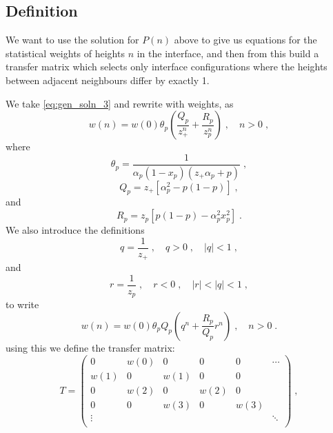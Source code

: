 \documentclass[a4paper,10pt]{article}
\begin{document}
\subsection{Definition}

We want to use the solution for $P(n)$ above to give us equations for the statistical weights of heights $n$ in the interface, and then from this build a transfer matrix which selects only interface configurations where the heights between adjacent neighbours differ by exactly 1. 

We take \eqref{eq:gen_soln_3} and rewrite with weights, as
\begin{equation}
  w(n) = w(0) \theta_p \left( \frac{Q_p}{z_+^{n}} + \frac{R_p}{z_p^{n}}  \right) \;, \quad n > 0 \;,
\end{equation}
where
\begin{equation}
 \theta_p = \frac{1}{ \alpha_p(1-x_p)(z_+\alpha_p + p)} \;, 
\end{equation}
\begin{equation}
  Q_p = z_+[\alpha_p^{2}-p(1-p)] \;,
\end{equation}
and
\begin{equation}
  R_p = z_p[ p(1-p) - \alpha_p^2 x_p^2] \;. 
\end{equation}
We also introduce the definitions
\begin{equation}
  q = \frac{1}{z_+} \;, \quad q > 0 \;, \quad |q| < 1 \;, 
\end{equation}
and
\begin{equation}
  r = \frac{1}{z_p} \;, \quad r < 0 \;, \quad |r| < |q|< 1 \;,
\end{equation}
to write
\begin{equation}
  w(n) = w(0) \theta_p Q_p \left( q^n + \frac{R_p}{Q_p} r^n  \right) \;, \quad n > 0 \;.
\end{equation}
using this we define the transfer matrix:
\begin{equation}
  T = \begin{pmatrix}
       0      & w(0)   & 0      & 0      & 0      & \cdots \\
       w(1)   & 0      & w(1)   & 0      & 0      &        \\
       0      & w(2)   & 0      & w(2)   & 0      &        \\
       0      & 0      & w(3)   & 0      & w(3)   &        \\
       \vdots &        &        &        &        & \ddots \\
      \end{pmatrix} \;, 
\end{equation}
\end{document}
